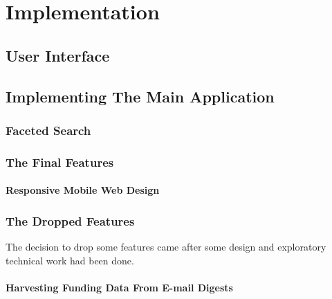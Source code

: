 \chapter{Implementation}



\section{User Interface}
\label{impl-ui}

\section{Implementing The Main Application}

\subsection{Faceted Search}
\label{impl-facetview}

\subsection{The Final Features}

\subsubsection{Responsive Mobile Web Design}
\label{impl-mobile}

\subsection{The Dropped Features}
The decision to drop some features came after some design and exploratory technical work had been done.

\subsubsection{Harvesting Funding Data From E-mail Digests}
\label{impl-email-parse}